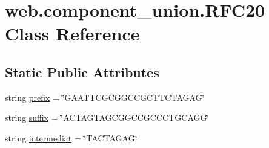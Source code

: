 \hypertarget{classweb_1_1component__union_1_1_r_f_c20}{\section{web.\-component\-\_\-union.\-R\-F\-C20 Class Reference}
\label{classweb_1_1component__union_1_1_r_f_c20}
}
\subsection*{Static Public Attributes}
\begin{DoxyCompactItemize}
\item 
string \hyperlink{classweb_1_1component__union_1_1_r_f_c20_ab205c2c6376fb4675b10f603414a0231}{prefix} = \char`\"{}G\-A\-A\-T\-T\-C\-G\-C\-G\-G\-C\-C\-G\-C\-T\-T\-C\-T\-A\-G\-A\-G\char`\"{}
\item 
string \hyperlink{classweb_1_1component__union_1_1_r_f_c20_a55fba88b8140182ab2640398452cd379}{suffix} = \char`\"{}A\-C\-T\-A\-G\-T\-A\-G\-C\-G\-G\-C\-C\-G\-C\-C\-C\-T\-G\-C\-A\-G\-G\char`\"{}
\item 
string \hyperlink{classweb_1_1component__union_1_1_r_f_c20_ae0900321fd9f180c245efe9f05628326}{intermediat} = \char`\"{}T\-A\-C\-T\-A\-G\-A\-G\char`\"{}
\end{DoxyCompactItemize}


